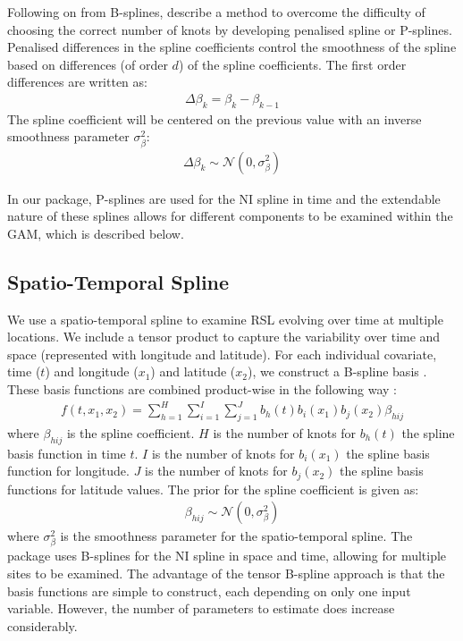 Following on from B-splines, \citet{eilers_1996} describe a method to overcome the difficulty of choosing the correct number of knots by developing penalised spline or P-splines. Penalised differences in the spline coefficients control the smoothness of the spline based on differences (of order \(d\)) of the spline coefficients. The first order differences are written as:
\begin{align}
\Delta\beta_k = \beta_k - \beta_{k-1}
\end{align}
The spline coefficient will be centered on the previous value with an inverse smoothness parameter \(\sigma^2_{\beta}\):
\begin{align}
\Delta \beta_k \sim \mathcal{N}(0, \sigma_{\beta}^2)
\end{align}

In our package, P-splines are used for the NI spline in time and the extendable nature of these splines allows for different components to be examined within the GAM, which is described below.

\subsection{Spatio-Temporal Spline}\label{spatialtemporalspline}

We use a spatio-temporal spline to examine RSL evolving over time at multiple locations. We include a tensor product to capture the variability over time and space (represented with longitude and latitude). For each individual covariate, time (\(t\)) and longitude (\(x_1\)) and latitude (\(x_2\)), we construct a B-spline basis \citep{Wood2017pspline}. These basis functions are combined product-wise in the following way \citep{Wood2006a}:
\begin{align}
  f(t,x_1,x_2) = \sum_{h=1}^{H}\sum_{i=1}^{I}\sum_{j=1}^{J} b_h(t) b_i(x_1) b_j(x_2) \beta_{hij}
\end{align}
where \(\beta_{hij}\) is the spline coefficient. \(H\) is the number of knots for \(b_h(t)\) the spline basis function in time \(t\). \(I\) is the number of knots for \(b_i(x_1)\) the spline basis function for longitude. \(J\) is the number of knots for \(b_j(x_2)\) the spline basis functions for latitude values. The prior for the spline coefficient is given as:
\begin{align}
\beta_{hij} \sim \mathcal{N} (0, \sigma^2_{\beta})
\end{align}
where \(\sigma^2_{\beta}\) is the smoothness parameter for the spatio-temporal spline. The  package uses B-splines for the NI spline in space and time, allowing for multiple sites to be examined. The advantage of the tensor B-spline approach is that the basis functions are simple to construct, each depending on only one input variable. However, the number of parameters to estimate does increase considerably.

